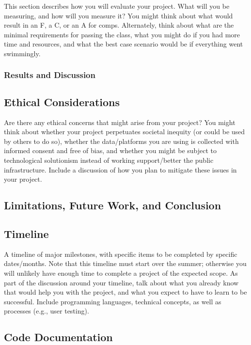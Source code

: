 \documentclass[10pt,twocolumn]{article}
\begin{document}
This section describes how you will evaluate your project.
What will you be measuring, and how will you measure it?
You might think about what would result in an F, a C, or an A for comps.
Alternately, think about what are the minimal requirements for passing the class, what you might do if you had more time and resources, and what the best case scenario would be if everything went swimmingly.

\subsubsection{Results and Discussion}

\subsection{Ethical Considerations}

Are there any ethical concerns that might arise from your project?
You might think about whether your project perpetuates societal inequity (or could be used by others to do so), whether the data/platforms you are using is collected with informed consent and free of bias, and whether you might be subject to technological solutionism instead of working support/better the public infrastructure.
Include a discussion of how you plan to mitigate these issues in your project.

\subsection{Limitations, Future Work, and Conclusion}

\subsection{Timeline}

A timeline of major milestones, with specific items to be completed by specific dates/months.
Note that this timeline must start over the summer; otherwise you will unlikely have enough time to complete a project of the expected scope.
As part of the discussion around your timeline, talk about what you already know that would help you with the project, and what you expect to have to learn to be successful.
Include programming languages, technical concepts, as well as processes (e.g., user testing).

\subsection{Code Documentation}
\end{document}
